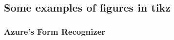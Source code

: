 

\subsection{Some examples of figures in tikz}




\subsubsection{Azure's Form Recognizer}


\cleardoublepage